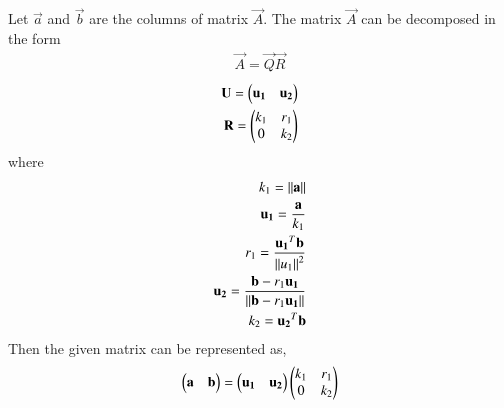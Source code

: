 
Let $\vec{a}$ and $\vec{b}$ are the columns of matrix $\vec{A}$. The matrix $\vec{A}$ can be decomposed in the form
\begin{align}
    \vec{A}=\vec{Q}\vec{R}
\end{align}
\begin{align}
    \mathbf{U}=\begin{pmatrix}\mathbf{u_1}&\mathbf{u_2}\end{pmatrix}\\
    \mathbf{R}=\begin{pmatrix}k_1&r_1\\0&k_2\end{pmatrix}
\end{align}
where
\begin{align}
    k_1=\left\lVert\mathbf{a}\right\rVert\label{eq:solutions/2/24/k1}\\
    \mathbf{u_1}=\frac{\mathbf{a}}{k_1}\label{eq:solutions/2/24/u1}\\
    r_1=\frac{\mathbf{u_1}^T\mathbf{b}}{\left\lVert u_1\right\rVert^2}\label{eq:solutions/2/24/r1}\\
    \mathbf{u_2}=\frac{\mathbf{b}-r_1\mathbf{u_1}}{\left\lVert\mathbf{b}-r_1\mathbf{u_1}\right\rVert}\label{eq:solutions/2/24/u2}\\
    k_2=\mathbf{u_2}^T\mathbf{b}\label{eq:solutions/2/24/k2}
\end{align}
Then the given matrix can be represented as,
\begin{align}\label{eq:solutions/2/24/rep}
    \begin{pmatrix}\mathbf{a}&\mathbf{b}\end{pmatrix}=\begin{pmatrix}\mathbf{u_1}&\mathbf{u_2}\end{pmatrix}\begin{pmatrix}k_1&r_1\\0&k_2\end{pmatrix}
\end{align}
